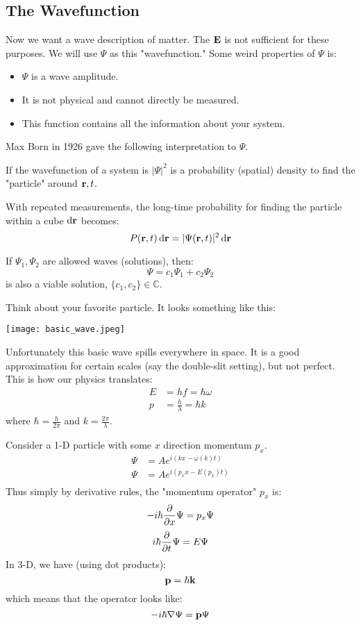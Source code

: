 \subsection{The Wavefunction}
Now we want a wave description of matter. The $\mathbf{E}$ is not sufficient for these purposes. We will use $\Psi$ as this "wavefunction." Some weird properties
of $\Psi$ is:
\begin{itemize}
    \item $\Psi$ is a wave amplitude.
    \item It is not physical and cannot directly be measured.
    \item This function contains all the information about your system.
\end{itemize}
Max Born in 1926 gave the following interpretation to $\Psi$.
\begin{theorem}
    If the wavefunction of a system is $|\Psi|^2$ is a probability (spatial) density to find the "particle" around $\mathbf{r}, t$.
\end{theorem}
With repeated measurements, the long-time probability for finding the particle within a cube $\dd{\mathbf{r}}$ becomes:
\[ P(\mathbf{r}, t) \dd{\mathbf{r}} = |\Psi(\mathbf{r}, t)|^2 \dd{\mathbf{r}} \]
\begin{theorem}[Superposition]
    If $\Psi_1, \Psi_2$ are allowed waves (solutions), then:
    \[ \Psi = c_1 \Psi_1 + c_2 \Psi_2 \]
    is also a viable solution, $\{c_1, c_2\} \in \mathbb{C}$.
\end{theorem}
Think about your favorite particle. It looks something like this:

\texttt{[image: basic\_wave.jpeg]}

Unfortunately this basic wave spills everywhere in space. It is a good approximation for certain scales (say the double-slit setting), but not perfect. This is how our physics translates: 
\begin{align*}
    E &= hf = \hbar \omega \\
    p &= \frac{h}{\lambda} = \hbar k
\end{align*}
where $\hbar = \frac{h}{2\pi}$ and $k = \frac{2\pi}{\lambda}$.

Consider a 1-D particle with some $x$ direction momentum $p_x$.
\begin{align*}
    \Psi &= A e^{i(k x - \omega(k) t)} \\
    \Psi &= Ae^{i(p_x x - E(p_x) t)} \\
\end{align*}
Thus simply by derivative rules, the "momentum operator" $p_x$ is:
\[ - i \hbar \partialderivative{}{x} \Psi = p_x \Psi \]
\[ i \hbar \partialderivative{}{t} \Psi = E \Psi \]
In 3-D, we have (using dot products):
\[ \mathbf{p} = \hbar \mathbf{k} \]
which means that the operator looks like:
\[ - i \hbar \nabla \Psi = \mathbf{p} \Psi\]
